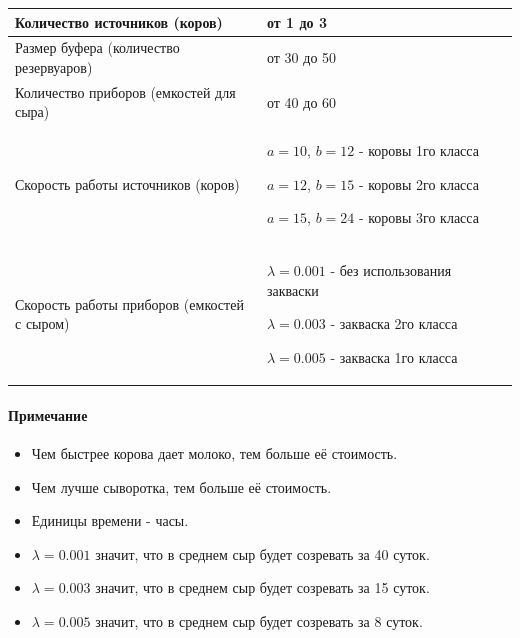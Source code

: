 \documentclass[a4paper, 14pt]{article}
\begin{document}
\begin{center}
	\begin{tabular}{|p{0.5\linewidth} | p{0.5\linewidth}|}
		\hline
		Количество источников (коров)               & от 1 до 3                                                                                                                                \\
		\hline
		Размер буфера (количество резервуаров)      & от 30 до 50                                                                                                                              \\
		\hline
		Количество приборов (емкостей для сыра)     & от 40 до 60                                                                                                                              \\
		\hline
		Скорость работы источников (коров)          & $a = 10$, $b = 12$ - коровы 1го класса \par $a = 12$, $b = 15$ - коровы 2го класса \par $a = 15$, $b = 24$ - коровы 3го класса           \\
		\hline
		Скорость работы приборов (емкостей с сыром) & $\lambda = 0.001$ - без использования закваски \par $\lambda = 0.003$ - закваска 2го класса \par $\lambda = 0.005$ - закваска 1го класса \\
		\hline
	\end{tabular}
\end{center}

\paragraph{Примечание}

\begin{itemize}
	\item Чем быстрее корова дает молоко, тем больше её стоимость.
	\item Чем лучше сыворотка, тем больше её стоимость.
	\item Единицы времени - часы.
	\item $\lambda = 0.001$ значит, что в среднем сыр будет созревать за 40 суток.
	\item $\lambda = 0.003$ значит, что в среднем сыр будет созревать за 15 суток.
	\item $\lambda = 0.005$ значит, что в среднем сыр будет созревать за 8 суток.
\end{itemize}
\end{document}
